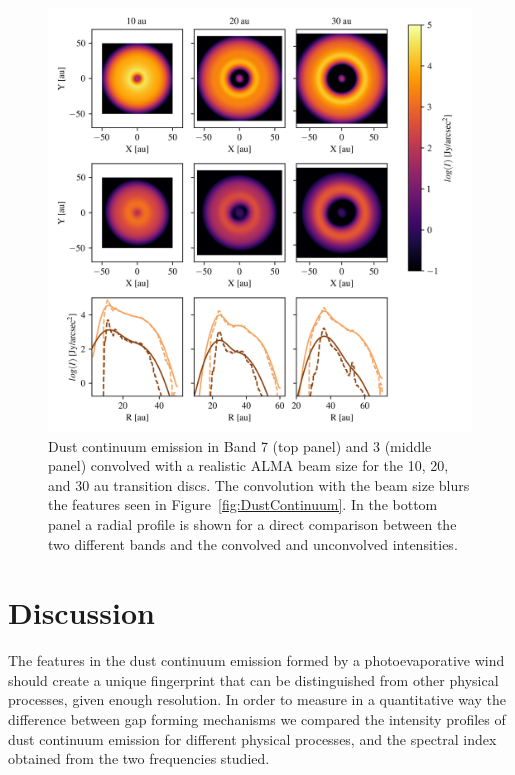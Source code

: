 \documentclass[fleqn,usenatbib]{mnras}
\begin{document}
        \begin{figure}
          \centering
          \includegraphics[width=\textwidth]{comparison_conv}
          \caption{Dust continuum emission in Band 7 (top panel) and 3 (middle panel) convolved with a realistic ALMA beam size for the 10, 20, and 30 au transition discs. The convolution with the beam size blurs the features seen in Figure~\ref{fig:DustContinuum}. In the bottom panel a radial profile is shown for a direct comparison between the two different bands and the convolved and unconvolved intensities.}
          \label{fig:comp_beam}
        \end{figure}

\section{Discussion} \label{sec:discussion}
    The features in the dust continuum emission formed by a photoevaporative wind should create a unique fingerprint that can be distinguished from other physical processes, given enough resolution.
    In order to measure in a quantitative way the difference between gap forming mechanisms we compared the intensity profiles of dust continuum emission for different physical processes, and the spectral index obtained from the two frequencies studied.
\end{document}
